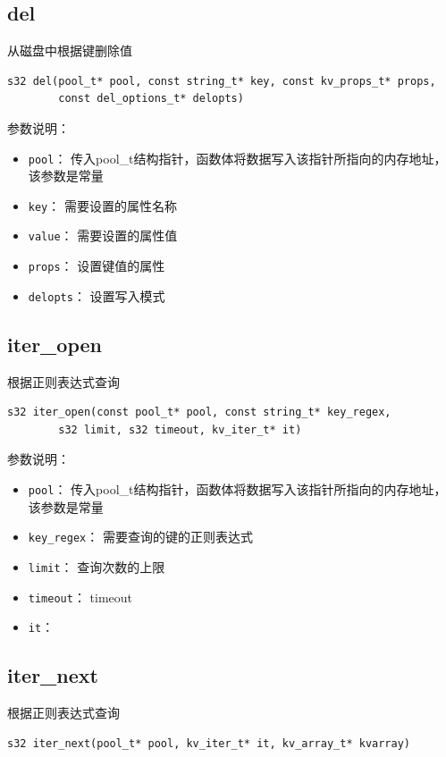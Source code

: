 		\subsection{del}
			从磁盘中根据键删除值
		\begin{Verbatim}[frame = none]
    s32 del(pool_t* pool, const string_t* key, const kv_props_t* props, 
        const del_options_t* delopts)
		\end{Verbatim}

		参数说明：
		\begin{itemize}
		\item \verb|pool|：
			传入pool\_t结构指针，函数体将数据写入该指针所指向的内存地址，该参数是常量
		\item \verb|key|：
			需要设置的属性名称
		\item \verb|value|：
			需要设置的属性值
		\item \verb|props|：
			设置键值的属性
		\item \verb|delopts|：
			设置写入模式
		\end{itemize}

		\subsection{iter\_open}
			根据正则表达式查询
		\begin{Verbatim}[frame = none]
    s32 iter_open(const pool_t* pool, const string_t* key_regex, 
        s32 limit, s32 timeout, kv_iter_t* it)
		\end{Verbatim}

		参数说明：
		\begin{itemize}
		\item \verb|pool|：
			传入pool\_t结构指针，函数体将数据写入该指针所指向的内存地址，该参数是常量
		\item \verb|key_regex|：
			需要查询的键的正则表达式
		\item \verb|limit|：
			查询次数的上限
		\item \verb|timeout|：
			timeout
		\item \verb|it|：
			
		\end{itemize}

		\subsection{iter\_next}
			根据正则表达式查询
		\begin{Verbatim}[frame = none]
    s32 iter_next(pool_t* pool, kv_iter_t* it, kv_array_t* kvarray)
		\end{Verbatim}

